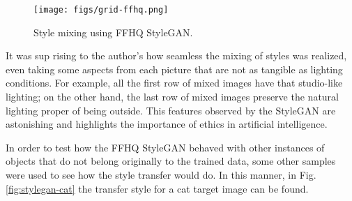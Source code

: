 \documentclass[conference]{IEEEtran}
\theoremstyle{definition}
\theoremstyle{remark}
\theoremstyle{remark}
\begin{document}
\begin{figure}
  \centering \texttt{[image: figs/grid-ffhq.png]}
  \caption{Style mixing using FFHQ StyleGAN.}
  \label{fig:grid-ffhq}
\end{figure}

It was sup rising to the author's how seamless the mixing of styles was
realized, even taking some aspects from each picture that are not as tangible as
lighting conditions. For example, all the first row of mixed images have that
studio-like lighting; on the other hand, the last row of mixed images preserve
the natural lighting proper of being outside. This features observed by the
StyleGAN are astonishing and highlights the importance of ethics in artificial
intelligence.

In order to test how the FFHQ StyleGAN behaved with other instances of objects
that do not belong originally to the trained data, some other samples were used
to see how the style transfer would do. In this manner, in Fig.
\ref{fig:stylegan-cat} the transfer style for a cat target image can be found.
\end{document}
